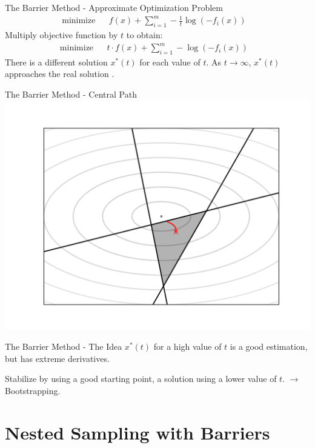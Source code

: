 \documentclass[]{beamer}
\begin{document}
  \begin{frame}{The Barrier Method - Approximate Optimization Problem}
    \begin{align*}
      &\textrm{minimize} && f(x) + \sum_{i=1}^m -\frac{1}{t}\log(-f_i(x))&&
    \end{align*}
    \pause
    Multiply objective function by $t$ to obtain:
    \begin{align*}
      &\textrm{minimize} && t \cdot f(x) + \sum_{i=1}^m -\log(-f_i(x))&&
    \end{align*}
    There is a different solution $x^*(t)$ for each value of $t$. 
    As $t \rightarrow \infty$, $x^*(t)$ approaches the real solution \cite[p. 561ff.]{boyd}.
  \end{frame}

  \begin{frame}{The Barrier Method - Central Path}
    \centering
    \includegraphics[trim={1.4cm 0.8cm 1cm 0.8cm}, clip, scale=0.6]{figs/barrier_method_example.png}
  \end{frame}

  \begin{frame}{The Barrier Method - The Idea}
    $x^*(t)$ for a high value of $t$ is a good estimation, but has extreme derivatives.

    \pause
    Stabilize by using a good starting point, a solution using a lower value of $t$. $\rightarrow$ Bootstrapping.
  \end{frame}

  \section{Nested Sampling with Barriers}
\end{document}
